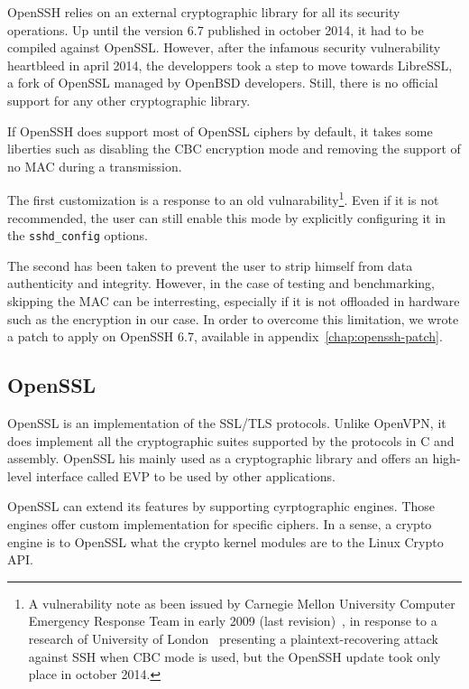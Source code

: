 OpenSSH relies on an external cryptographic library for all its security operations.
Up until the version 6.7 published in october 2014, it had to be compiled against OpenSSL.
However, after the infamous security vulnerability heartbleed in april 2014, the developpers took a step to move towards LibreSSL, a fork of OpenSSL managed by OpenBSD  developers.
Still, there is no official support for any other cryptographic library.

If OpenSSH does support most of OpenSSL ciphers by default, it takes some liberties such as disabling the CBC encryption mode and removing the support of no MAC during a transmission.

\noindent The first customization is a response to an old vulnarability\footnote{A vulnerability note as been issued by Carnegie Mellon University Computer Emergency Response Team in early 2009 (last revision)~\cite{CERT2009}, in response to a research of University of London~\cite{Albrecht:2009} presenting a plaintext-recovering attack against SSH when CBC mode is used, but the OpenSSH update took only place in october 2014.}.
Even if it is not recommended, the user can still enable this mode by explicitly configuring it in the \texttt{sshd\_config} options.

\noindent The second has been taken to prevent the user to strip himself from data authenticity and integrity.
However, in the case of testing and benchmarking, skipping the MAC can be interresting, especially if it is not offloaded in hardware such as the encryption in our case.
In order to overcome this limitation, we wrote a patch to apply on OpenSSH 6.7, available in appendix~\ref{chap:openssh-patch}.




\subsection{OpenSSL}\label{sec:implem-openssl}

OpenSSL is an implementation of the SSL/TLS protocols.
Unlike OpenVPN, it does implement all the cryptographic suites supported by the protocols in C and assembly.
OpenSSL his mainly used as a cryptographic library and offers an high-level interface called EVP to be used by other applications.

OpenSSL can extend its features by supporting cyrptographic engines.
Those engines offer custom implementation for specific ciphers.
In a sense, a crypto engine is to OpenSSL what the crypto kernel modules are to the Linux Crypto API.

